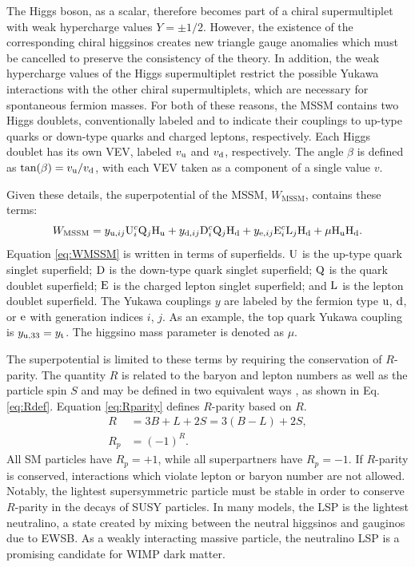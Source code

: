 \documentclass[12pt]{thesis}  %
\newcommand{\Pe}{\ensuremath{\cmsSymbolFace{e}}\xspace}
\providecommand{\PU}{\ensuremath{\cmsSymbolFace{U}}\xspace}
\providecommand{\PD}{\ensuremath{\cmsSymbolFace{D}}\xspace}
\providecommand{\PQ}{\ensuremath{\cmsSymbolFace{Q}}\xspace}
\providecommand{\PE}{\ensuremath{\cmsSymbolFace{E}}\xspace}
\providecommand{\PL}{\ensuremath{\cmsSymbolFace{L}}\xspace}
\begin{document}
The Higgs boson, as a scalar, therefore becomes part of a chiral supermultiplet with weak hypercharge values $Y = \pm 1/2$. However, the existence of the corresponding chiral higgsinos creates new triangle gauge anomalies which must be cancelled to preserve the consistency of the theory. In addition, the weak hypercharge values of the Higgs supermultiplet restrict the possible Yukawa interactions with the other chiral supermultiplets, which are necessary for spontaneous fermion masses. For both of these reasons, the MSSM contains two Higgs doublets, conventionally labeled \Hone and \Htwo to indicate their couplings to up-type quarks or down-type quarks and charged leptons, respectively. Each Higgs doublet has its own VEV, labeled $v_{\mathrm{u}}$ and $v_{\mathrm{d}}$, respectively. The angle $\beta$ is defined as $\text{tan}(\beta) = v_{\mathrm{u}}/v_{\mathrm{d}}$, with each VEV taken as a component of a single value $v$.

Given these details, the superpotential of the MSSM, $W_{\text{MSSM}}$, contains these terms:
\begin{equation}
W_{\text{MSSM}} = y_{\cPqu,ij}\PU_{i}^{c}\PQ_{j}\Hone + y_{\cPqd,ij}\PD_{i}^{c}\PQ_{j}\Htwo + y_{\Pe,ij}\PE_{i}^{c}\PL_{j}\Htwo + \mu \Hone \Htwo. \label{eq:WMSSM}
\end{equation}
Equation \eqref{eq:WMSSM} is written in terms of superfields. $\PU$ is the up-type quark singlet superfield; $\PD$ is the down-type quark singlet superfield; $\PQ$ is the quark doublet superfield; $\PE$ is the charged lepton singlet superfield; and $\PL$ is the lepton doublet superfield. The Yukawa couplings $y$ are labeled by the fermion type $\mathrm{u}$, $\mathrm{d}$, or $\Pe$ with generation indices $i$, $j$. As an example, the top quark Yukawa coupling is $y_{\mathrm{u},33} = y_{\mathrm{t}}$. The higgsino mass parameter is denoted as $\mu$.

The superpotential is limited to these terms by requiring the conservation of $R$-parity. The quantity $R$ is related to the baryon and lepton numbers as well as the particle spin $S$ and may be defined in two equivalent ways \cite{Barbier}, as shown in Eq. \eqref{eq:Rdef}. Equation \eqref{eq:Rparity} defines $R$-parity based on $R$.
\begin{align}
R &= 3B+L+2S = 3(B-L)+2S, \label{eq:Rdef} \\
R_{p} &= (-1)^{R}. \label{eq:Rparity}
\end{align}
All SM particles have $R_{p} = +1$, while all superpartners have $R_{p} = -1$. If $R$-parity is conserved, interactions which violate lepton or baryon number are not allowed. Notably, the lightest supersymmetric particle must be stable in order to conserve $R$-parity in the decays of SUSY particles. In many models, the LSP is the lightest neutralino, a state created by mixing between the neutral higgsinos and gauginos due to EWSB. As a weakly interacting massive particle, the neutralino LSP is a promising candidate for WIMP dark matter.
\end{document}
